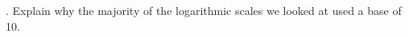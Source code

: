 \documentclass[12pt]{article}
\begin{document}
. Explain why the majority of the logarithmic scales we looked at used a base of 10.\vspace{5mm}
\vspace{10mm} %
\noindent \makebox[\linewidth]{\dotfill} %
\vspace{10mm}
\noindent \makebox[\linewidth]{\dotfill}
\vspace{10mm}
\noindent \makebox[\linewidth]{\dotfill}
\end{document}

